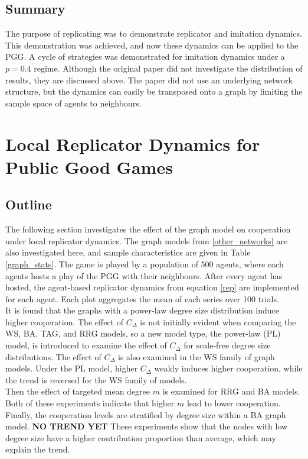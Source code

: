 \subsection{Summary}
The purpose of replicating \cite{RN30} was to demonstrate replicator and imitation dynamics. This demonstration was achieved, and now these dynamics can be applied to the PGG. A cycle of strategies was demonstrated for imitation dynamics under a $p=0.4$ regime. Although the original paper did not investigate the distribution of results, they are discussed above. The paper \cite{RN30} did not use an underlying network structure, but the dynamics can easily be transposed onto a graph by limiting the sample space of agents to neighbours. \\


\section{Local Replicator Dynamics for Public Good Games}
\subsection{Outline}
The following section investigates the effect of the graph model on cooperation under local replicator dynamics. The graph models from \ref{other_networks} are also investigated here, and sample characteristics are given in Table \ref{graph_stats}. The game is played by a population of 500 agents, where each agents hosts a play of the PGG with their neighbours. After every agent has hosted, the agent-based replicator dynamics from equation \eqref{rep} are implemented for each agent. Each plot aggregates the mean of each series over 100 trials. \\

It is found that the graphs with a power-law degree size distribution induce higher cooperation. The effect of $C_\Delta$ is not initially evident when comparing the WS, BA, TAG, and RRG models, so a new model type, the power-law (PL) model, is introduced to examine the effect of $C_\Delta$ for scale-free degree size distributions. The effect of $C_\Delta$ is also examined in the WS family of graph models. Under the PL model, higher $C_\Delta$ weakly induces higher cooperation, while the trend is reversed for the WS family of models. \\

Then the effect of targeted mean degree $m$ is examined for RRG and BA models. Both of these experiments indicate that higher $m$ lead to lower cooperation. Finally, the cooperation levels are stratified by degree size within a BA graph model. \textbf{NO TREND YET} These experiments show that the nodes with low degree size have a higher contribution proportion than average, which may explain the trend. \\

